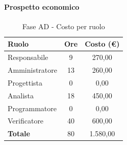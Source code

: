 \documentclass[../PianoProgetto.tex]{subfiles}
\begin{document}
\vfill
	
	\paragraph{Prospetto economico}
	
					\begin{table}[h]
		\centering
	
		\begin{tabular}{l * {2}{c}}
			\toprule
			\textbf{Ruolo} & \textbf{Ore} & \textbf{Costo (\euro{})} \\
			\midrule
			Responsabile &	9 & 270,00 \\
			Amministratore & 13 & 260,00 \\
			Progettista & 0 & 0,00 \\
			Analista & 18 & 450,00 \\
			Programmatore & 0 & 0,00 \\
			Verificatore & 40 & 600,00 \\
			\midrule		
			\textbf{Totale} & 80 & 1.580,00 \\
			\bottomrule
		\end{tabular}
		\caption{Fase AD - Costo per ruolo}
		\label{tab:faseAD_costo}
	\end{table}
\vfill
\newpage
	
\end{document}
